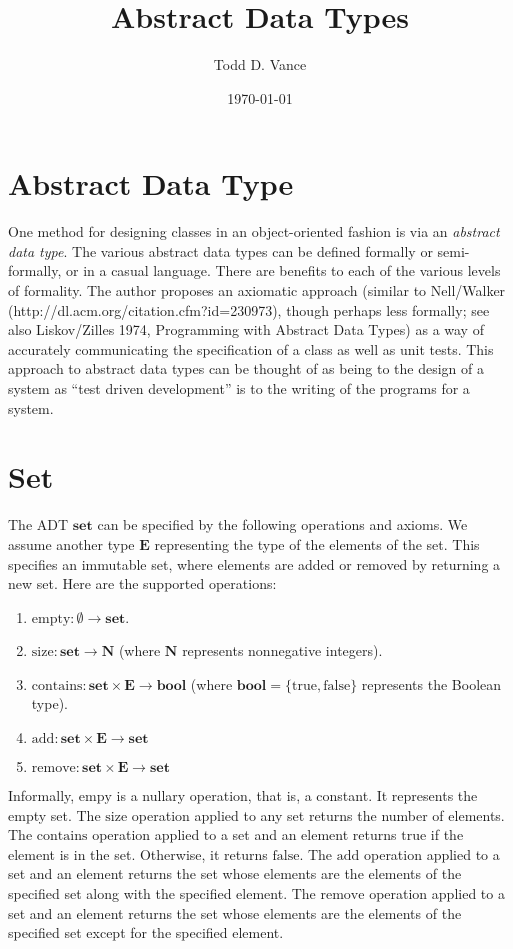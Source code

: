 \documentclass{amsart}
\title{Abstract Data Types}
\author{Todd D. Vance}
\date{\today}
\begin{document}
\maketitle{}

\section{Abstract Data Type}
One method for designing classes in an object-oriented fashion is via an \emph{abstract data type}.  The various abstract data types can be defined formally or semi-formally, or in a casual language.  There are benefits to each of the various levels of formality.  The author proposes an axiomatic approach (similar to Nell/Walker (http://dl.acm.org/citation.cfm?id=230973), though perhaps less formally; see also Liskov/Zilles 1974, Programming with Abstract Data Types) as a way of accurately communicating the specification of a class as well as unit tests.  This approach to abstract data types can be thought of as being to the design of a system as ``test driven development'' is to the writing of the programs for a system.


\section{Set}
The ADT $\mathbf{set}$ can be specified by the following operations and axioms.  We assume another type $\mathbf{E}$ representing the type of the elements of the set.  This specifies an immutable set, where elements are added or removed by returning a new set.  Here are the supported operations:

\begin{enumerate}
\item $\mathrm{empty}:\emptyset\rightarrow\mathbf{set}$.
\item $\mathrm{size}:\mathbf{set}\rightarrow\mathbf{N}$ (where $\mathbf{N}$ represents nonnegative integers).
\item $\mathrm{contains}:\mathbf{set}\times\mathbf{E}\rightarrow\mathbf{bool}$ (where $\mathbf{bool}=\{\mathrm{true},\mathrm{false}\}$ represents the Boolean type).
\item $\mathrm{add}:\mathbf{set}\times\mathbf{E}\rightarrow\mathbf{set}$
\item $\mathrm{remove}:\mathbf{set}\times\mathbf{E}\rightarrow\mathbf{set}$
\end{enumerate}

Informally, $\mathrm{empy}$ is a nullary operation, that is, a constant.  It represents the empty set.  The $\mathrm{size}$ operation applied to any set returns the number of elements.  The $\mathrm{contains}$ operation applied to a set and an element returns $\mathrm{true}$ if the element is in the set.  Otherwise, it returns $\mathrm{false}$.  The $\mathrm{add}$ operation applied to a set and an element returns the set whose elements are the elements of the specified set along with the specified element.  The $\mathrm{remove}$ operation applied to a set and an element returns the set whose elements are the elements of the specified set except for the specified element.
\end{document}
